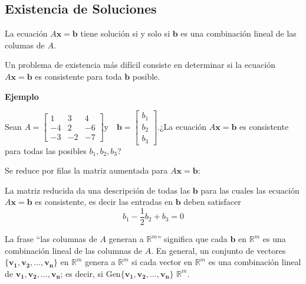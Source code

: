 \documentclass{article}
\begin{document}
\subsection*{Existencia de Soluciones}

\begin{tcolorbox}[colback=blue!10!white,colframe=blue!60!black,title=Solución de Ecuación Matricial]
    La ecuación $A\mathbf{x} = \mathbf{b}$ tiene solución si y solo si $\mathbf{b}$ es una combinación lineal de las columas de $A$.
\end{tcolorbox}

Un problema de existencia más difícil consiste en determinar si la ecuación $A\mathbf{x} = \mathbf{b}$ es consistente para toda $\mathbf{b}$ posible.

\begin{large}
    \textbf{Ejemplo}
\end{large}

Sean $A=\begin{bmatrix}
    1&3&4\\
    -4&2&-6\\
    -3&-2&-7
\end{bmatrix} 
\text{y} \quad \mathbf{b}=\begin{bmatrix} b_1\\b_2\\b_3 \end{bmatrix}$.¿La ecuación $A\mathbf{x} = \mathbf{b}$ es consistente para todas las posibles $b_1, b_2, b_3$?

Se reduce por filas la matriz aumentada para $A\mathbf{x} = \mathbf{b}$:


La matriz reducida da una descripción de todas las $\mathbf{b}$ para las cuales las ecuación $A\mathbf{x} = \mathbf{b}$ es consistente, es decir las entradas en $\mathbf{b}$ deben satisfacer $$b_1 - \frac{1}{2}b_2 + b_3 = 0$$

La frase “las columnas de $A$ generan a $\mathbb{R}^m$” significa que cada $\mathbf{b}$ en $\mathbb{R}^m$ es una combinación lineal de las columnas de $A$. En general, un conjunto de vectores $\{\mathbf{v_1}, \mathbf{v_2},..., \mathbf{v_n}\}$ en $\mathbb{R}^m$ genera a $\mathbb{R}^m$ si cada vector en $\mathbb{R}^m$ es una combinación lineal de $\mathbf{v_1}, \mathbf{v_2},..., \mathbf{v_n}$; es decir, si Gen$\{\mathbf{v_1}, \mathbf{v_2},..., \mathbf{v_n}\}$ $\mathbb{R}^m$.
\end{document}

